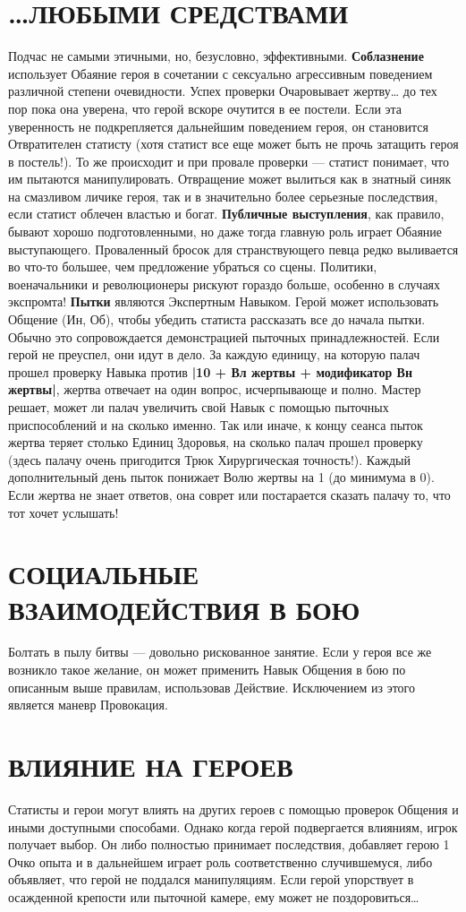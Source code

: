 \section{…ЛЮБЫМИ СРЕДСТВАМИ}
Подчас не самыми этичными, но, безусловно, эффективными.
\newline \textbf{Соблазнение} использует Обаяние героя в сочетании с сексуально агрессивным поведением различной степени очевидности. Успех проверки Очаровывает жертву… до тех пор пока она уверена, что герой вскоре очутится в ее постели. Если эта уверенность не подкрепляется дальнейшим поведением героя, он становится Отвратителен статисту (хотя статист все еще может быть не прочь затащить героя в постель!). То же происходит и при провале проверки — статист понимает, что им пытаются манипулировать. Отвращение может вылиться как в знатный синяк на смазливом личике героя, так и в значительно более серьезные последствия, если статист облечен властью и богат.
\newline \textbf{Публичные выступления}, как правило, бывают хорошо подготовленными, но даже тогда главную роль играет Обаяние выступающего. Проваленный бросок для странствующего певца редко выливается во что-то большее, чем предложение убраться со сцены. Политики, военачальники и революционеры рискуют гораздо больше, особенно в случаях экспромта!
\newline \textbf{Пытки} являются Экспертным Навыком. Герой может использовать Общение (Ин, Об), чтобы убедить статиста рассказать все до начала пытки. Обычно это сопровождается демонстрацией пыточных принадлежностей. Если герой не преуспел, они идут в дело. За каждую единицу, на которую палач прошел проверку Навыка против \textbf{|10 + Вл жертвы + модификатор Вн жертвы|}, жертва отвечает на один вопрос, исчерпывающе и полно. Мастер решает, может ли палач увеличить свой Навык с помощью пыточных приспособлений и на сколько именно. Так или иначе, к концу сеанса пыток жертва теряет столько Единиц Здоровья, на сколько палач прошел проверку (здесь палачу очень пригодится Трюк Хирургическая точность!). Каждый дополнительный день пыток понижает Волю жертвы на 1 (до минимума в 0). Если жертва не знает ответов, она соврет или постарается сказать палачу то, что тот хочет услышать!
\section{СОЦИАЛЬНЫЕ ВЗАИМОДЕЙСТВИЯ В БОЮ}
Болтать в пылу битвы — довольно рискованное занятие. Если у героя все же возникло такое желание, он может применить Навык Общения в бою по описанным выше правилам, использовав Действие. Исключением из этого является маневр Провокация.
\section{ВЛИЯНИЕ НА ГЕРОЕВ}
Статисты и герои могут влиять на других героев с помощью проверок Общения и иными доступными способами. Однако когда герой подвергается влияниям, игрок получает выбор. Он либо полностью принимает последствия, добавляет герою 1 Очко опыта и в дальнейшем играет роль соответственно случившемуся, либо объявляет, что герой не поддался манипуляциям. Если герой упорствует в осажденной крепости или пыточной камере, ему может не поздоровиться…